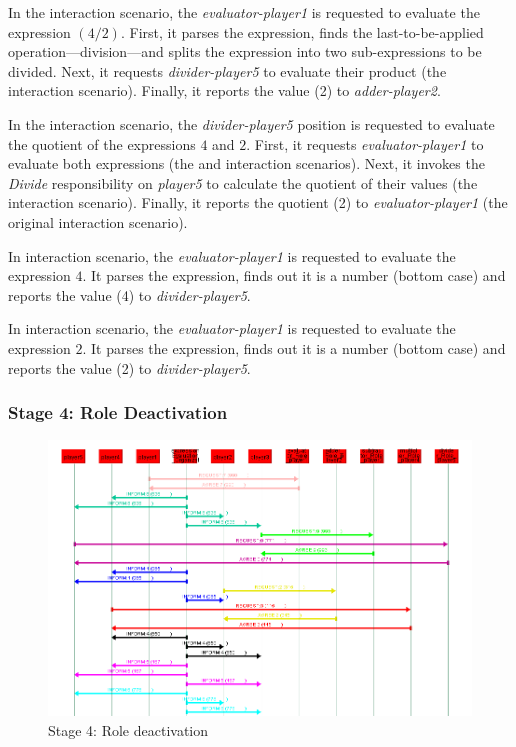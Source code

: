 In the {} interaction scenario, the \textit{evaluator-player1} is requested to evaluate the expression $(4/2)$.
First, it parses the expression, finds the last-to-be-applied operation---division---and splits the expression into two sub-expressions to be divided.
Next, it requests \textit{divider-player5} to evaluate their product (the {} interaction scenario).
Finally, it reports the value (2) to \textit{adder-player2}.

In the {} interaction scenario, the \textit{divider-player5} position is requested to evaluate the quotient of the expressions $4$ and $2$.
First, it requests \textit{evaluator-player1} to evaluate both expressions (the {} and {} interaction scenarios).
Next, it invokes the \textit{Divide} responsibility on \textit{player5} to calculate the quotient of their values (the {} interaction scenario).
Finally, it reports the quotient (2) to \textit{evaluator-player1} (the original {} interaction scenario).

In {} interaction scenario, the \textit{evaluator-player1} is requested to evaluate the expression $4$.
It parses the expression, finds out it is a number (bottom case) and reports the value (4) to \textit{divider-player5}.

In {} interaction scenario, the \textit{evaluator-player1} is requested to evaluate the expression $2$.
It parses the expression, finds out it is a number (bottom case) and reports the value (2) to \textit{divider-player5}.

\subsubsection*{Stage 4: Role Deactivation}

\begin{figure}[H]
	\centering
	\includegraphics[width=\textwidth]{images/examples/example2-stage4}
	\caption{Stage 4: Role deactivation}
	\label{figure:example2-stage4}
\end{figure}

